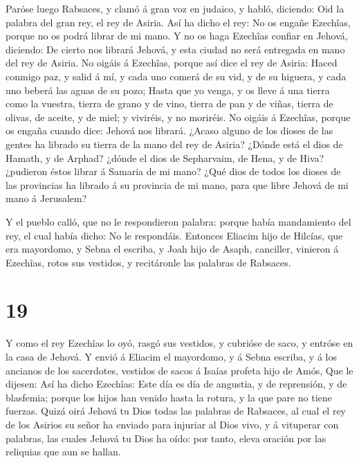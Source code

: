  Paróse luego Rabsaces, y clamó á gran voz en judaico, y
habló, diciendo: Oid la palabra del gran rey, el rey de Asiria.
 Así ha dicho el rey: No os engañe Ezechîas, porque no os
podrá librar de mi mano.  Y no os haga Ezechîas confiar en
Jehová, diciendo: De cierto nos librará Jehová, y esta ciudad no será
entregada en mano del rey de Asiria.  No oigáis á Ezechîas,
porque así dice el rey de Asiria: Haced conmigo paz, y salid á mí, y
cada uno comerá de su vid, y de su higuera, y cada uno beberá las aguas
de su pozo;  Hasta que yo venga, y os lleve á una tierra
como la vuestra, tierra de grano y de vino, tierra de pan y de viñas,
tierra de olivas, de aceite, y de miel; y viviréis, y no moriréis. No
oigáis á Ezechîas, porque os engaña cuando dice: Jehová nos librará.
 ¿Acaso alguno de los dioses de las gentes ha librado su
tierra de la mano del rey de Asiria?  ¿Dónde está el dios
de Hamath, y de Arphad? ¿dónde el dios de Sepharvaim, de Hena, y de
Hiva? ¿pudieron éstos librar á Samaria de mi mano?  ¿Qué
dios de todos los dioses de las provincias ha librado á su provincia de
mi mano, para que libre Jehová de mi mano á Jerusalem?

 Y el pueblo calló, que no le respondieron palabra: porque
había mandamiento del rey, el cual había dicho: No le respondáis.
 Entonces Eliacim hijo de Hilcías, que era mayordomo, y
Sebna el escriba, y Joah hijo de Asaph, canciller, vinieron á Ezechîas,
rotos sus vestidos, y recitáronle las palabras de Rabsaces.

\hypertarget{section-18}{%
\section{19}\label{section-18}}

 Y como el rey Ezechîas lo oyó, rasgó sus vestidos, y
cubrióse de saco, y entróse en la casa de Jehová.  Y envió á
Eliacim el mayordomo, y á Sebna escriba, y á los ancianos de los
sacerdotes, vestidos de sacos á Isaías profeta hijo de Amós,
 Que le dijesen: Así ha dicho Ezechîas: Este día es día de
angustia, y de reprensión, y de blasfemia; porque los hijos han venido
hasta la rotura, y la que pare no tiene fuerzas.  Quizá oirá
Jehová tu Dios todas las palabras de Rabsaces, al cual el rey de los
Asirios su señor ha enviado para injuriar al Dios vivo, y á vituperar
con palabras, las cuales Jehová tu Dios ha oído: por tanto, eleva
oración por las reliquias que aun se hallan.

